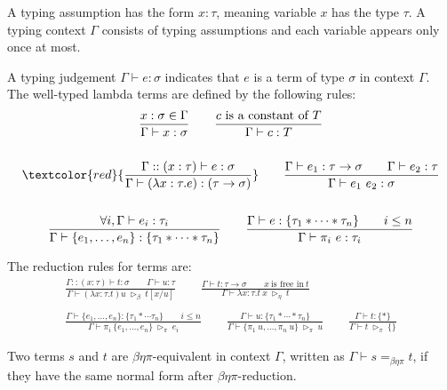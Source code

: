 \begin{definition}
    \label{def:STLC_tuple_typing}
    A typing assumption has the form $x : \tau$, meaning variable $x$ has the type $\tau$. A typing context $\Gamma$ consists of typing assumptions and each variable appears only once at most.

    A typing judgement $\Gamma \vdash e : \sigma$ indicates that $e$ is a term of type $\sigma$ in context $\Gamma$. The well-typed lambda terms are defined by the following rules:
    \begin{gather*}
        \frac{x : \sigma \in \Gamma}{\Gamma \vdash x : \sigma}
        \qquad \frac{c\ \textrm{is a constant of}\ T}{\Gamma \vdash c : T}\\
        \ \\
        \textcolor{red}{\frac{\Gamma::(x : \tau) \vdash e : \sigma}{\Gamma \vdash (\lambda x : \tau.e) : (\tau \to \sigma)}}
        \qquad \frac{\Gamma \vdash e_1 : \tau \to \sigma \qquad \Gamma \vdash e_2 : \tau}{\Gamma \vdash e_1\ e_2 : \sigma}\\
        \ \\
        \frac{\forall i, \Gamma \vdash e_i : \tau_i}{\Gamma \vdash \{e_1, \dots, e_n \} : \{ \tau_1 * \cdots * \tau_n\}}
        \qquad 
        \frac{\Gamma \vdash e : \{ \tau_1 * \cdots * \tau_n \} \qquad i \leq n}{\Gamma \vdash \pi_i\ e : \tau_i}
    \end{gather*}
\end{definition}

\begin{definition}
    \label{def:STLC_tuple_red}
    The reduction rules for terms are:
    \begin{gather*}
        \frac{\Gamma::(x:\tau)\vdash t:\sigma\qquad \Gamma\vdash u:\tau}{\Gamma \vdash (\lambda x : \tau.t)u \ \triangleright_\beta\ t[x/u]}
        \qquad 
        \frac{\Gamma \vdash t : \tau \to \sigma\qquad x\ \textrm{is free in}\ t}{\Gamma \vdash \lambda x : \tau. t\ x\ \triangleright_\eta\ t}\\
        \ \\
        \frac{\Gamma \vdash \{e_1, \dots, e_n \} : \{ \tau_1 * \cdots \tau_n\}\qquad i \leq n}{\Gamma \vdash \pi_i\ \{e_1, \dots, e_n \}\ \triangleright_\pi\ e_i}
        \qquad
        \frac{\Gamma \vdash u : \{ \tau_1 * \cdots * \tau_n\}}{\Gamma \vdash \{\pi_1\ u, \dots, \pi_n\ u \}\ \triangleright_\pi\ u}
        \qquad
        \frac{\Gamma \vdash t : \{*\}}{\Gamma \vdash t\ \triangleright_\pi\ \{\}}
    \end{gather*}

    Two terms $s$ and $t$ are $\beta\eta\pi$-equivalent in context $\Gamma$, written as $\Gamma \vdash s =_{\beta\eta\pi} t$, if they have the same normal form after $\beta\eta\pi$-reduction.
\end{definition}

